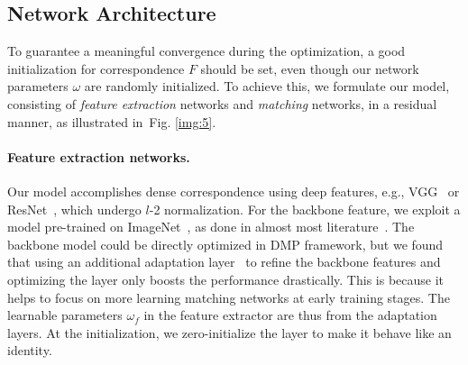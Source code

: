 \documentclass[10pt,twocolumn,letterpaper]{article}
\newcommand{\figref}[1]{Fig. \ref{#1}}
\begin{document}
\subsection{Network Architecture}\label{sec:3_4}
To guarantee a meaningful convergence during the optimization, a good initialization for correspondence $F$ should be set, even though our network parameters $\omega$ are randomly initialized. 
To achieve this, we formulate our model, consisting of \emph{feature extraction} networks and \emph{matching} networks, in a residual manner, as illustrated in~\figref{img:5}. \vspace{-10pt}

\paragraph{Feature extraction networks.}
Our model accomplishes dense correspondence using deep features, e.g., VGG~\cite{simonyan2014very} or ResNet~\cite{he2016deep}, which undergo $l$-2 normalization. For the backbone feature, we exploit a model pre-trained on ImageNet~\cite{deng2009imagenet}, as done in almost most literature~\cite{rocco2018neighbourhood,kim2019semantic,melekhov2019dgc,kim2019semantic,truong2020glu,shen2020ransac}. The backbone model could be directly optimized in DMP framework, but we found that using an additional adaptation layer~\cite{lee2019sfnet} to refine the backbone features and optimizing the layer only boosts the performance drastically. This is because it helps to focus on more learning matching networks at early training stages. The learnable parameters $\omega_f$ in the feature extractor are thus from the adaptation layers. At the initialization, we zero-initialize the layer to make it behave like an identity.
\vspace{-10pt}
\begin{figure*}[t]
	\centering
	\renewcommand{\thesubfigure}{}
	\\
	\vspace{-10pt}
	\caption{\textbf{Network configuration and loss function of DMP:} Our networks consist of feature extraction and matching networks, which are formulated in a residual manner to guarantee a good initialization for optimization. Note that a single-level version of the networks are illustrated for brevity, while the full model is formulated in a pyramidal fashion. A confidence-aware contrastive loss enables joint learning of feature extraction and matching networks by rejecting ambiguous matches while accepting confident matches through a thresholding.}\vspace{-10pt}\label{img:5}
\end{figure*}
\end{document}
